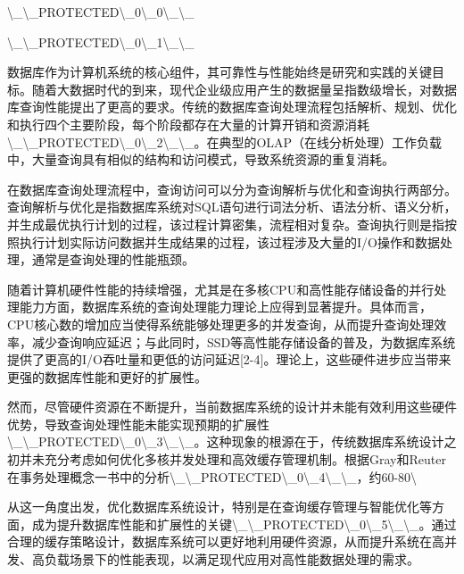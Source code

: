 \textbackslash{}_\textbackslash{}_PROTECTED\textbackslash{}_0\textbackslash{}_0\textbackslash{}_\textbackslash{}_

\textbackslash{}_\textbackslash{}_PROTECTED\textbackslash{}_0\textbackslash{}_1\textbackslash{}_\textbackslash{}_

数据库作为计算机系统的核心组件，其可靠性与性能始终是研究和实践的关键目标。随着大数据时代的到来，现代企业级应用产生的数据量呈指数级增长，对数据库查询性能提出了更高的要求。传统的数据库查询处理流程包括解析、规划、优化和执行四个主要阶段，每个阶段都存在大量的计算开销和资源消耗\textbackslash{}_\textbackslash{}_PROTECTED\textbackslash{}_0\textbackslash{}_2\textbackslash{}_\textbackslash{}_。在典型的OLAP（在线分析处理）工作负载中，大量查询具有相似的结构和访问模式，导致系统资源的重复消耗。

在数据库查询处理流程中，查询访问可以分为查询解析与优化和查询执行两部分。查询解析与优化是指数据库系统对SQL语句进行词法分析、语法分析、语义分析，并生成最优执行计划的过程，该过程计算密集，流程相对复杂。查询执行则是指按照执行计划实际访问数据并生成结果的过程，该过程涉及大量的I/O操作和数据处理，通常是查询处理的性能瓶颈。

随着计算机硬件性能的持续增强，尤其是在多核CPU和高性能存储设备的并行处理能力方面，数据库系统的查询处理能力理论上应得到显著提升。具体而言，CPU核心数的增加应当使得系统能够处理更多的并发查询，从而提升查询处理效率，减少查询响应延迟；与此同时，SSD等高性能存储设备的普及，为数据库系统提供了更高的I/O吞吐量和更低的访问延迟[2-4]。理论上，这些硬件进步应当带来更强的数据库性能和更好的扩展性。

然而，尽管硬件资源在不断提升，当前数据库系统的设计并未能有效利用这些硬件优势，导致查询处理性能未能实现预期的扩展性\textbackslash{}_\textbackslash{}_PROTECTED\textbackslash{}_0\textbackslash{}_3\textbackslash{}_\textbackslash{}_。这种现象的根源在于，传统数据库系统设计之初并未充分考虑如何优化多核并发处理和高效缓存管理机制。根据Gray和Reuter在事务处理概念一书中的分析\textbackslash{}_\textbackslash{}_PROTECTED\textbackslash{}_0\textbackslash{}_4\textbackslash{}_\textbackslash{}_，约60-80\textbackslash{}%

从这一角度出发，优化数据库系统设计，特别是在查询缓存管理与智能优化等方面，成为提升数据库性能和扩展性的关键\textbackslash{}_\textbackslash{}_PROTECTED\textbackslash{}_0\textbackslash{}_5\textbackslash{}_\textbackslash{}_。通过合理的缓存策略设计，数据库系统可以更好地利用硬件资源，从而提升系统在高并发、高负载场景下的性能表现，以满足现代应用对高性能数据处理的需求。

